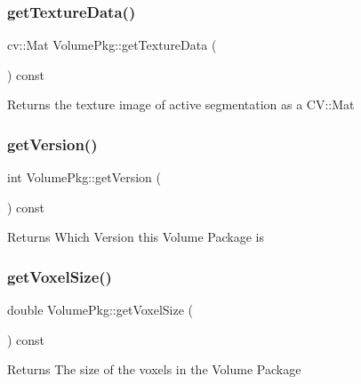 \subsubsection{\texorpdfstring{get\+Texture\+Data()}{getTextureData()}}
{\footnotesize\ttfamily cv\+::\+Mat Volume\+Pkg\+::get\+Texture\+Data (\begin{DoxyParamCaption}{ }\end{DoxyParamCaption}) const}

\begin{DoxyReturn}{Returns}
the texture image of active segmentation as a C\+V\+::\+Mat 
\end{DoxyReturn}
\hypertarget{classVolumePkg_a2a0e7f720aab28e7c67e22fc37051c0c}{}\label{classVolumePkg_a2a0e7f720aab28e7c67e22fc37051c0c} 
\subsubsection{\texorpdfstring{get\+Version()}{getVersion()}}
{\footnotesize\ttfamily int Volume\+Pkg\+::get\+Version (\begin{DoxyParamCaption}{ }\end{DoxyParamCaption}) const}

\begin{DoxyReturn}{Returns}
Which Version this Volume Package is 
\end{DoxyReturn}
\hypertarget{classVolumePkg_a0fb419c7902913a8b98fb5aafb90685e}{}\label{classVolumePkg_a0fb419c7902913a8b98fb5aafb90685e} 
\subsubsection{\texorpdfstring{get\+Voxel\+Size()}{getVoxelSize()}}
{\footnotesize\ttfamily double Volume\+Pkg\+::get\+Voxel\+Size (\begin{DoxyParamCaption}{ }\end{DoxyParamCaption}) const}

\begin{DoxyReturn}{Returns}
The size of the voxels in the Volume Package 
\end{DoxyReturn}
\hypertarget{classVolumePkg_a1136333d9a9c3f8914cdb547336c586b}{}\label{classVolumePkg_a1136333d9a9c3f8914cdb547336c586b} 
